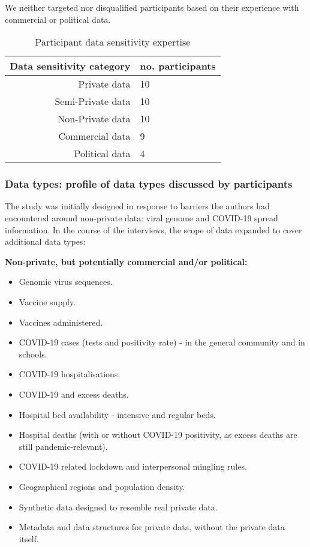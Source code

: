 \documentclass{CUP-JNL-DAP}%
\begin{document}
We neither targeted nor disqualified participants based on their experience with commercial or political data. 

\begin{table}[h!]
  \begin{center}
    \caption{Participant data sensitivity expertise}
    \label{tab:data_sensitivity}
    \begin{tabular}{r|l}  %
      \textbf{Data sensitivity category} & \textbf{no. participants} \\
      \hline
      Private data & 10\\
      Semi-Private data & 10\\
      Non-Private data & 10 \\
      Commercial data & 9\\ 
      Political data & 4\\ 
    \end{tabular}
  \end{center}
\end{table}

\subsubsection{Data types: profile of data types discussed by participants}
The study was initially designed in response to barriers the authors had encountered around non-private data: viral genome and COVID-19 spread information. In the course of the interviews, the scope of data expanded to cover additional data types: 

\textbf{Non-private, but potentially commercial and/or political:}
\begin{itemize}
\item Genomic virus sequences.
\item Vaccine supply.
\item Vaccines administered.
\item COVID-19 cases (tests and positivity rate) - in the general community and in schools.
\item COVID-19 hospitalisations.
\item COVID-19 and excess deaths.
\item Hospital bed availability - intensive and regular beds.
\item Hospital deaths (with or without COVID-19 positivity, as excess deaths are still pandemic-relevant).
\item COVID-19 related lockdown and interpersonal mingling rules.
\item Geographical regions and population density.
\item Synthetic data designed to resemble real private data.
\item Metadata and data structures for private data, without the private data itself. 
\end{itemize}
\end{document}
